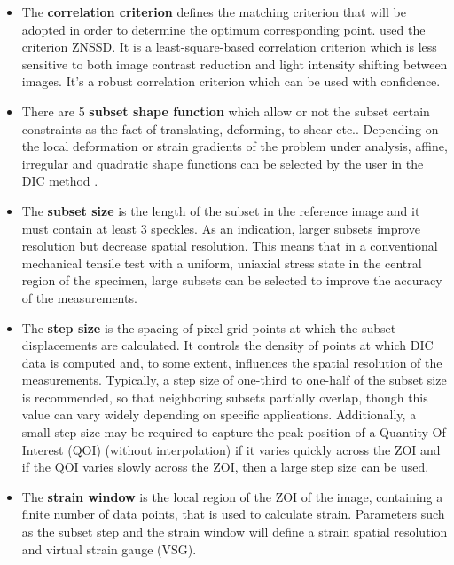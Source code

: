 \begin{itemize}
	\item The \textbf{correlation criterion} defines the matching criterion that will be adopted in order to determine the optimum corresponding point. \cite{MALFAIT2021}  used the criterion ZNSSD. It is a least-square-based correlation criterion which is less sensitive to both image contrast reduction and light intensity shifting between images. It's a robust correlation criterion which can be used with confidence. 
	\item There are 5 \textbf{subset shape function} which allow or not the subset certain constraints as the fact of translating, deforming, to shear etc.. Depending on the local deformation or strain gradients of the problem under analysis, affine, irregular and quadratic shape functions can be selected by the user in the DIC method \cite{PereiraandXavier2018}. 
	\item The \textbf{subset size} is the length of the subset in the reference image and it must contain at least 3 speckles. As an indication, larger subsets improve resolution but decrease spatial resolution. This means that in a conventional mechanical tensile test with a uniform, uniaxial stress state in the central region of the specimen, large subsets can be selected to improve the accuracy of the measurements.
	\item The \textbf{step size} is the spacing of pixel grid points at which the subset displacements are calculated. It controls the density of points at which DIC data is computed and, to some extent, influences the spatial resolution of the measurements. Typically, a step size of one-third to one-half of the subset size is recommended, so that neighboring subsets partially overlap, though this value can vary widely depending on specific applications. Additionally, a small step size may be required to capture the peak position of a Quantity Of Interest (QOI) (without interpolation) if it varies quickly across the ZOI and if the QOI varies slowly across the ZOI, then a large step size can be used. 
	\item The \textbf{strain window} is the local region of the ZOI of the image, containing a finite number of data points, that is used to calculate strain. Parameters such as the subset step and the strain window will define a strain spatial resolution and virtual strain gauge (VSG). 

\end{itemize}
